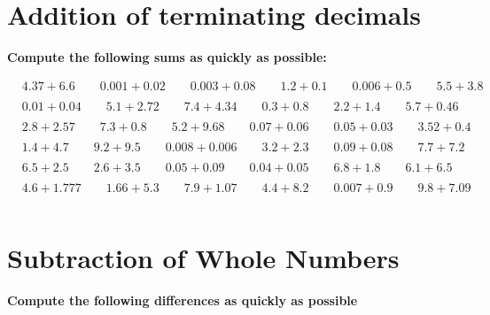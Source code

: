 \documentclass{article}
\begin{document}
\section{Addition of terminating decimals}



\bigskip

\textbf{Compute the following sums as quickly as possible:}

\bigskip

\(\begin{aligned}
	&4.37+6.6 \qquad  0.001+0.02 \qquad 0.003+0.08  \qquad  1.2+0.1  \qquad 0.006+0.5  \qquad  5.5+3.8   \\\\
	&0.01+0.04  \qquad  5.1+2.72   \qquad   7.4+4.34  \qquad  0.3+0.8  \qquad   2.2+1.4  \qquad  5.7+0.46 \\\\
	&2.8+2.57   \qquad  7.3+0.8    \qquad   5.2+9.68  \qquad 0.07+0.06 \qquad  0.05+0.03 \qquad 3.52+0.4  \\\\
	&1.4+4.7    \qquad  9.2+9.5    \qquad 0.008+0.006 \qquad  3.2+2.3  \qquad  0.09+0.08 \qquad  7.7+7.2   \\\\
	&6.5+2.5    \qquad  2.6+3.5    \qquad  0.05+0.09  \qquad 0.04+0.05 \qquad   6.8+1.8  \qquad  6.1+6.5   \\\\
	&4.6+1.777  \qquad 1.66+5.3    \qquad    7.9+1.07    \qquad   4.4+8.2   \qquad    0.007+0.9   \qquad  9.8+7.09  \\\\
\end{aligned}\)

\bigskip

\section{Subtraction of Whole Numbers}

\textbf{Compute the following differences as quickly as possible}

\bigskip
\end{document}
